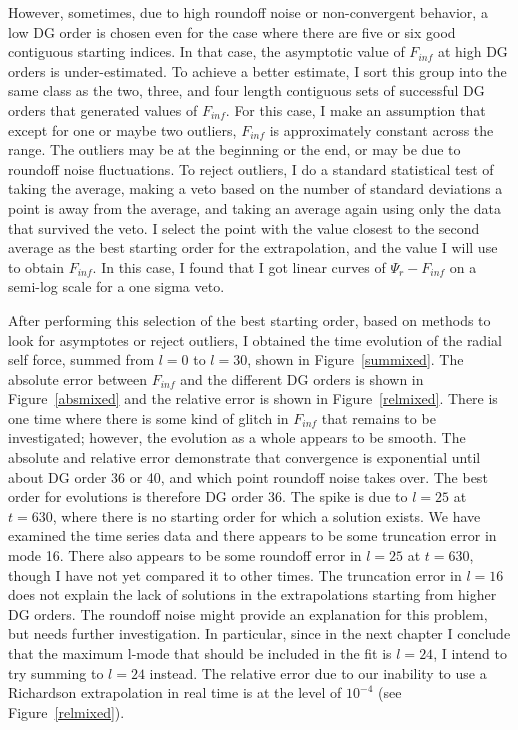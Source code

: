 However, sometimes, due to high roundoff noise or non-convergent behavior, a low DG order is chosen even for the case where there are five or six good contiguous starting indices. In that case, the asymptotic value of $F_{inf}$ at high DG orders is under-estimated. To achieve a better estimate, I sort this group into the same class as the two, three, and four length contiguous sets of successful DG orders that generated values of $F_{inf}$. For this case, I make an assumption that except for one or maybe two outliers, $F_{inf}$ is approximately constant across the range. The outliers may be at the beginning or the end, or may be due to roundoff noise fluctuations. To reject outliers, I do a standard statistical test of taking the average, making a veto based on the number of standard deviations a point is away from the average, and taking an average again using only the data that survived the veto. I select the point with the value closest to the second average as the best starting order for the extrapolation, and the value I will use to obtain $F_{inf}$. In this case, I found that I got linear curves of $\Psi_r-F_{inf}$ on a semi-log scale for a one sigma veto.

After performing this selection of the best starting order, based on methods to look for asymptotes or reject outliers, I obtained the time evolution of the radial self force, summed from $l=0$ to $l=30$, shown in Figure~\ref{summixed}. The absolute error between $F_{inf}$ and the different DG orders is shown in Figure~\ref{absmixed} and the relative error is shown in Figure~\ref{relmixed}. There is one time where there is some kind of glitch in $F_{inf}$ that remains to be investigated; however, the evolution as a whole appears to be smooth. The absolute and relative error demonstrate that convergence is exponential until about DG order 36 or 40, and which point roundoff noise takes over. The best order for evolutions is therefore DG order 36. The spike is due to $l=25$ at $t=630$, where there is no starting order for which a solution exists. We have examined the time series data and there appears to be some truncation error in mode 16. There also appears to be some roundoff error in $l=25$ at $t=630$, though I have not yet compared it to other times. The truncation error in $l=16$ does not explain the lack of solutions in the extrapolations starting from higher DG orders. The roundoff noise might provide an explanation for this problem, but needs further investigation. In particular, since in the next chapter I conclude that the maximum l-mode that should be included in the fit is $l=24$, I intend to try summing to $l=24$ instead. The relative error due to our inability to use a Richardson extrapolation in real time is at the level of $10^{-4}$ (see Figure~\ref{relmixed}).

